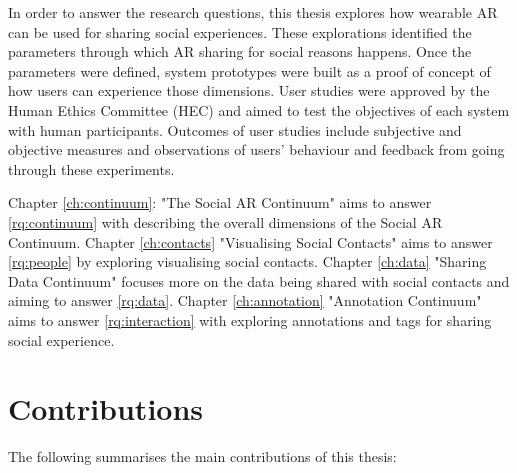 In order to answer the research questions, this thesis explores how wearable AR can be used for sharing social experiences. These explorations identified the parameters through which AR sharing for social reasons happens. Once the parameters were defined, system prototypes were built as a proof of concept of how users can experience those dimensions. User studies were approved by the Human Ethics Committee (HEC) and aimed to test the objectives of each system with human participants. Outcomes of user studies include subjective and objective measures and observations of users' behaviour and feedback from going through these experiments. 

Chapter \ref{ch:continuum}: "The Social AR Continuum" aims to answer \ref{rq:continuum} with describing the overall dimensions of the Social AR Continuum. 
Chapter \ref{ch:contacts} "Visualising Social Contacts" aims to answer \ref{rq:people} by exploring visualising social contacts. 
Chapter \ref{ch:data} "Sharing Data Continuum" focuses more on the data being shared with social contacts and aiming to answer \ref{rq:data}.
Chapter \ref{ch:annotation} "Annotation Continuum" aims to answer \ref{rq:interaction} with exploring annotations and tags for sharing social experience. 

\pagebreak
\section{Contributions}

The following summarises the main contributions of this thesis: 

